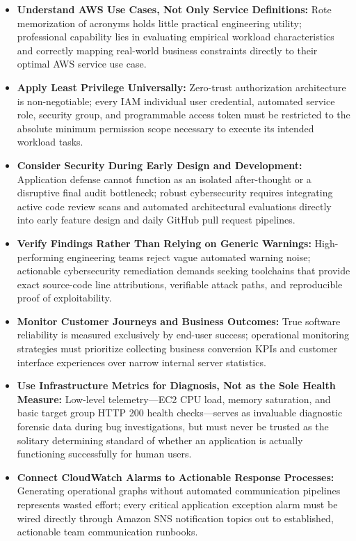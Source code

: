\begin{itemize}
\tightlist
\item
  \textbf{Understand AWS Use Cases, Not Only Service Definitions:} Rote
  memorization of acronyms holds little practical engineering utility;
  professional capability lies in evaluating empirical workload
  characteristics and correctly mapping real-world business constraints
  directly to their optimal AWS service use case.
\item
  \textbf{Apply Least Privilege Universally:} Zero-trust authorization
  architecture is non-negotiable; every IAM individual user credential,
  automated service role, security group, and programmable access token
  must be restricted to the absolute minimum permission scope necessary
  to execute its intended workload tasks.
\item
  \textbf{Consider Security During Early Design and Development:}
  Application defense cannot function as an isolated after-thought or a
  disruptive final audit bottleneck; robust cybersecurity requires
  integrating active code review scans and automated architectural
  evaluations directly into early feature design and daily GitHub pull
  request pipelines.
\item
  \textbf{Verify Findings Rather Than Relying on Generic Warnings:}
  High-performing engineering teams reject vague automated warning
  noise; actionable cybersecurity remediation demands seeking toolchains
  that provide exact source-code line attributions, verifiable attack
  paths, and reproducible proof of exploitability.
\item
  \textbf{Monitor Customer Journeys and Business Outcomes:} True
  software reliability is measured exclusively by end-user success;
  operational monitoring strategies must prioritize collecting business
  conversion KPIs and customer interface experiences over narrow
  internal server statistics.
\item
  \textbf{Use Infrastructure Metrics for Diagnosis, Not as the Sole
  Health Measure:} Low-level telemetry---EC2 CPU load, memory
  saturation, and basic target group HTTP 200 health checks---serves as
  invaluable diagnostic forensic data during bug investigations, but
  must never be trusted as the solitary determining standard of whether
  an application is actually functioning successfully for human users.
\item
  \textbf{Connect CloudWatch Alarms to Actionable Response Processes:}
  Generating operational graphs without automated communication
  pipelines represents wasted effort; every critical application
  exception alarm must be wired directly through Amazon SNS notification
  topics out to established, actionable team communication runbooks.
\end{itemize}

